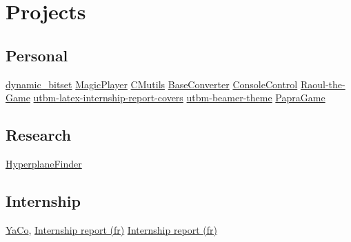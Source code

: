 \documentclass[letterpaper,10pt,sans]{moderncv}
\renewcommand{\deletedSpace}{-2mm}
\begin{document}

	\vspace*{\deletedSpace}
	\section{Projects}
		\subsection{Personal}
				{\href{https://github.com/pinam45/dynamic_bitset}{dynamic\_bitset}}
				{\href{https://github.com/pinam45/MagicPlayer}{MagicPlayer}}
				{\href{https://github.com/pinam45/CMutils}{CMutils}}
				{\href{https://github.com/pinam45/BaseConverter}{BaseConverter}}
				{\href{https://github.com/pinam45/ConsoleControl}{ConsoleControl}}
				{\href{https://github.com/TiWinDeTea/Raoul-the-Game}{Raoul-the-Game}}
				{\href{https://github.com/pinam45/utbm-latex-internship-report-covers}{utbm-latex-internship-report-covers}}
				{\href{https://github.com/pinam45/utbm-beamer-theme}{utbm-beamer-theme}}
				{\href{https://github.com/TiWinDeTea/PapraGame}{PapraGame}}
		\subsection{Research}
				{\href{https://github.com/Lomadriel/HyperplaneFinder}{HyperplaneFinder}}
		\subsection{Internship}
				{\href{https://github.com/DGA-MI-SSI/YaCo}{YaCo}, \href{https://github.com/pinam45/UTBM_ST40_Rapport_de_stage_DGA/releases/latest}{Internship report (fr)}}
				{\href{https://github.com/pinam45/UTBM_ST40_Rapport_de_stage_DGA/releases/latest}{Internship report (fr)}}
\end{document}
